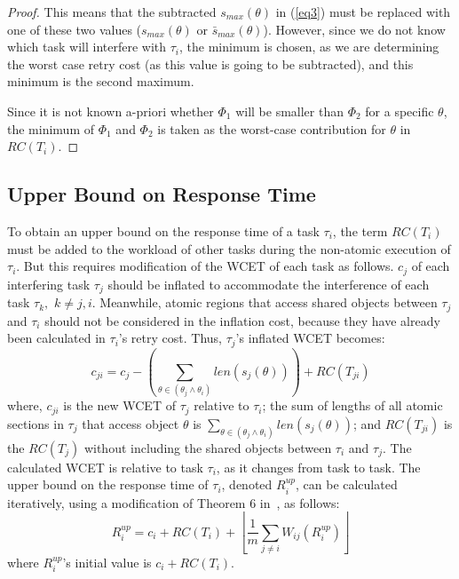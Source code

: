 \documentclass[letter]{sig-alternate}
\begin{document}
\begin{proof}
This means that the subtracted $s_{max}(\theta)$ in (\ref{eq3})
must be replaced with one of these two values ($s_{max}(\theta)$ or $\bar{s}_{max}(\theta)$). However, since we do not know  which task will interfere with $\tau_i$, the minimum is chosen, as we are determining the worst case retry cost (as this value is going to be subtracted),
and this minimum is the second maximum.

Since it is not known a-priori whether $\Phi_1$ will be smaller than $\Phi_2$ for a specific $\theta$, the minimum of $\Phi_1$ and $\Phi_2$ is taken as the worst-case contribution for $\theta$ in $RC(T_i)$. 
\end{proof}


\subsection{Upper Bound on Response Time}

To obtain an upper bound on the response time of a task $\tau_{i}$, the term $RC(T_{i})$ must be added to the workload of other tasks during the non-atomic
execution of $\tau_{i}$. But this requires modification of the WCET of each
task as follows. 
$c_{j}$ of each interfering task $\tau_{j}$ should be inflated to accommodate the interference of each task $\tau_{k},$ $k\ne j,i$. Meanwhile, atomic regions that access shared objects between $\tau_{j}$ and $\tau_{i}$ should not be considered in the inflation cost, because they have already been calculated in $\tau_{i}$'s retry cost. Thus, $\tau_{j}$'s inflated WCET becomes:
\begin{equation}
c_{ji}=c_{j}-\left(\sum_{\theta\in(\theta_{j}\wedge\theta_{i})}len \left(s_{j}(\theta) \right) \right)+RC(T_{ji})\label{eq9}\end{equation}
where, $c_{ji}$ is the new WCET of $\tau_{j}$ relative to $\tau_{i}$; 
the sum of lengths of all atomic sections in $\tau_{j}$ that access object $\theta$ is $\sum_{\theta \in (\theta_j \wedge \theta_i)} {len(s_{j}(\theta))}$; and $RC(T_{ji})$ is the $RC(T_j)$ 
 without including the shared objects between $\tau_{i}$ and $\tau_{j}$.
The calculated WCET is relative to task $\tau_{i}$, as it changes from task to task. The upper bound on the response time of $\tau_{i}$, denoted $R_{i}^{up}$, can be calculated iteratively, using a modification of Theorem 6 in~\cite{key-2}, as follows:
\begin{equation}
R_{i}^{up}=c_{i}+RC(T_{i})+\left\lfloor\frac{1}{m}\sum_{j\ne i}W_{ij}(R_{i}^{up})\right\rfloor
\label{eq10}
\end{equation}
where $R_{i}^{up}$'s initial value is $c_{i}+RC(T_{i})$.
\end{document}
